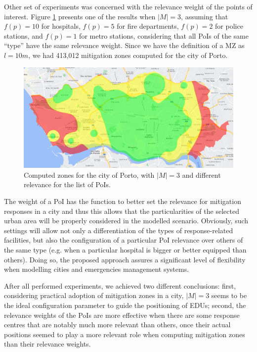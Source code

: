 \begin{refsection}
Other set of experiments was concerned with the relevance weight of the points of interest. Figure \ref{Fig:zones_porto_3_weight} presents one of the results when $|M|=3$, assuming that $f(p)=10$ for hospitals, $f(p)=5$ for fire departments, $f(p)=2$ for police stations, and $f(p)=1$ for metro stations, considering that all PoIs of the same ``type'' have the same relevance weight. Since we have the definition of a MZ as $l = 10m$, we had 413,012 mitigation zones computed for the city of Porto.

\begin{figure}[ht!]
    \centering
    \includegraphics[width=0.9\linewidth]{Chapters/2-EDUs/images/porto_M3.png}
    \caption{Computed zones for the city of Porto, with $|M|=3$ and different relevance for the list of PoIs.}
    \label{Fig:zones_porto_3_weight}
\end{figure}

The weight of a PoI has the function to better set the relevance for mitigation responses in a city and thus this allows that the particularities of the selected urban area will be properly considered in the modelled scenario. Obviously, such settings will allow not only a differentiation of the types of response-related facilities, but also the configuration of a particular PoI relevance over others of the same type (e.g. when a particular hospital is bigger or better equipped than others). Doing so, the proposed approach assures a significant level of flexibility when modelling cities and emergencies management systems.

After all performed experiments, we achieved two different conclusions: first, considering practical adoption of mitigation zones in a city, $|M|=3$ seems to be the ideal configuration parameter to guide the positioning of EDUs; second, the relevance weights of the PoIs are more effective when there are some response centres that are notably much more relevant than others, once their actual positions seemed to play a more relevant role when computing mitigation zones than their relevance weights.  


\end{refsection}
